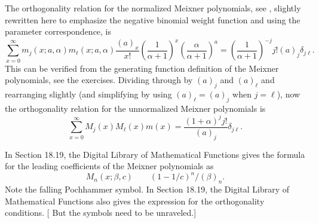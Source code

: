 \documentclass[12pt]{article}
\begin{document}
The orthogonality relation for the normalized Meixner polynomials, see
\cite[VI-3.4, 176]{chihara78}, slightly rewritten here to emphasize the
negative binomial weight function and using the parameter
correspondence, is
\[
    \sum_{x=0}^{\infty} m_j(x; a, \alpha) m_\ell(x; a, \alpha) \frac{(a)_x}
    {x!} \left( \frac{1}{\alpha+1} \right)^x \left( \frac{\alpha}{\alpha+1}
    \right)^a = \left( \frac{1}{\alpha+1} \right)^{-j} j!  (a)_j \delta_
    {j\ell}.
\] This can be verified from the generating function definition of the
Meixner polynomials, see the exercises.  Dividing through by \( (a)_j \)
and \( (a)_\ell \) and rearranging slightly (and simplifying by using \(
(a)_\ell = (a)_j \) when \( j = \ell \)), now the orthogonality relation
for the unnormalized Meixner polynomials is
\[
    \sum\limits_{x=0}^{\infty} M_j(x) M_\ell(x) m(x) = \frac{(1+\alpha)^j
    j!}{(a)_j} \delta_{j\ell}.
\]

In Section 18.19, the Digital Library of Mathematical Functions gives
the formula for the leading coefficients of the Meixner polynomials as
\[
    M_n(x; \beta, c) \qquad (1-1/c)^n/(\beta)_n.
\] Note the falling Pochhammer symbol.  In Section 18.19, the Digital
Library of Mathematical Functions also gives the expression for the
orthogonality conditions.  [ But the symbols need to be unraveled.]





\end{document}
